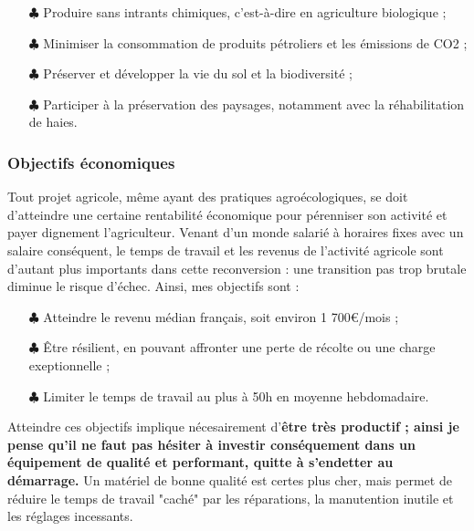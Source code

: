 \documentclass{book}
\begin{document}
\hspace{1cm}
\begin{itemize}

	\item[$\clubsuit$] Produire sans intrants chimiques, c'est-à-dire en agriculture biologique ;
	\item[$\clubsuit$] Minimiser la consommation de produits pétroliers et les émissions de CO2 ;
	\item[$\clubsuit$] Préserver et développer la vie du sol et la biodiversité ;
	
	\item[$\clubsuit$] Participer à la préservation des paysages, notamment avec la réhabilitation de haies.

\end{itemize}
\hspace{1cm}

\subsubsection{Objectifs économiques}

Tout projet agricole, même ayant des pratiques agroécologiques, se doit d'atteindre une certaine rentabilité économique pour pérenniser son activité et payer dignement l'agriculteur. Venant d’un monde salarié à horaires fixes avec un salaire conséquent, le temps de travail et les revenus de l'activité agricole sont d'autant plus importants dans cette reconversion : une transition pas trop brutale diminue le risque d’échec. Ainsi, mes objectifs sont :

\hspace{1cm}
\begin{itemize}

	\item[$\clubsuit$] Atteindre le revenu médian français, soit environ 1 700\euro{}/mois ; 
	\item[$\clubsuit$] Être résilient, en pouvant affronter une perte de récolte ou une charge exeptionnelle ;
	\item[$\clubsuit$] Limiter le temps de travail au plus à 50h en moyenne hebdomadaire.

\end{itemize}
\hspace{1cm}

Atteindre ces objectifs implique nécesairement d'\textbf{être très productif ; ainsi je pense qu'il ne faut pas hésiter à investir conséquement dans un équipement de qualité et performant, quitte à s'endetter au démarrage.} Un matériel de bonne qualité est certes plus cher, mais permet de réduire le temps de travail "caché" par les réparations, la manutention inutile et les réglages incessants.
\end{document}
